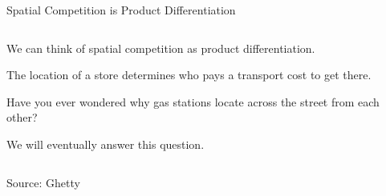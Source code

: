 \documentclass[aspectratio=169]{beamer}
\newenvironment{wideitemize}{\itemize\addtolength{\itemsep}{10pt}}{\enditemize}
\begin{document}
\begin{frame}{Spatial Competition is Product Differentiation}
    \begin{columns}[T] %
\begin{column}{.63\textwidth}
\begin{wideitemize}
    \item We can think of spatial competition as product differentiation.
    \item The location of a store determines who pays a transport cost to get there.
    \item Have you ever wondered why gas stations locate across the street from each other?
    \item We will eventually answer this question.
\end{wideitemize}
\end{column}%
\hfill%
\begin{column}{.34\textwidth}
\end{column}%
\end{columns}

  \hfill Source: Ghetty
\end{frame}
\end{document}
